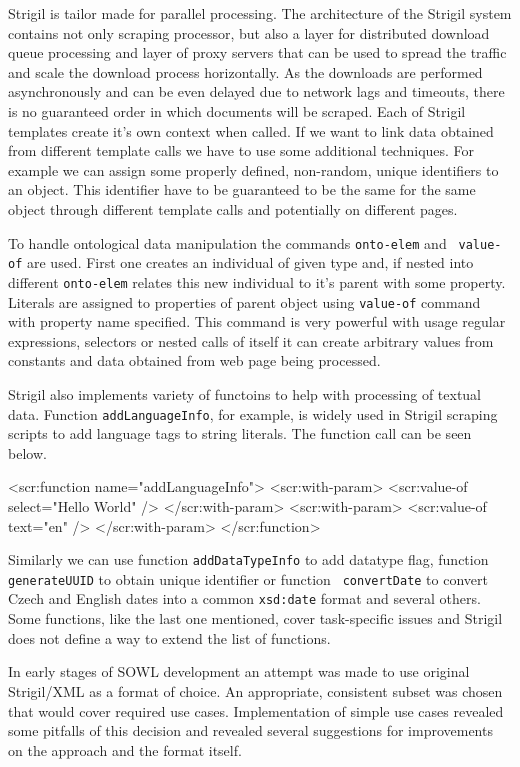 Strigil is tailor made for parallel processing. The architecture of the Strigil
system contains not only scraping processor, but also a layer for distributed
download queue processing and layer of proxy servers that can be used to spread
the traffic and scale the download process horizontally. As the downloads are
performed asynchronously and can be even delayed due to network lags and
timeouts, there is no guaranteed order in which documents will be scraped.
Each of Strigil templates create it's own context when called. If we want to
link data obtained from different template calls we have to use some additional
techniques. For example we can assign some properly defined, non-random, unique
identifiers to an object. This identifier have to be guaranteed to be the same
for the same object through different template calls and potentially on
different pages. 

To handle ontological data manipulation the commands {\tt onto-elem} and {\tt
value-of} are used. First one creates an individual of given type and, if
nested into different {\tt onto-elem} relates this new individual to it's
parent with some property. Literals are assigned to properties of parent object
using {\tt value-of} command with property name specified. This command is very
powerful with usage regular expressions, selectors or nested calls of itself it
can create arbitrary values from constants and data obtained from web page
being processed. 

Strigil also implements variety of functoins to help with processing of textual
data. Function {\tt addLanguageInfo}, for example, is widely used in Strigil
scraping scripts to add language tags to string literals. The function call can
be seen below. 

\begtt
<scr:function name="addLanguageInfo">
  <scr:with-param>
    <scr:value-of select="Hello World" />
  </scr:with-param>
  <scr:with-param>
    <scr:value-of text="en" />
  </scr:with-param>
</scr:function>
\endtt

Similarly we can use function {\tt addDataTypeInfo} to add datatype flag,
function {\tt generateUUID} to obtain unique identifier or function {\tt
convertDate} to convert Czech and English dates into a common {\tt xsd:date}
format and several others. Some functions, like the last one mentioned, cover
task-specific issues and Strigil does not define a way to extend the list of
functions. 

In early stages of SOWL development an attempt was made to use original
Strigil/XML as a format of choice. An appropriate, consistent subset was chosen
that would cover required use cases. Implementation of simple use cases
revealed some pitfalls of this decision and revealed several suggestions for
improvements on the approach and the format itself. 


